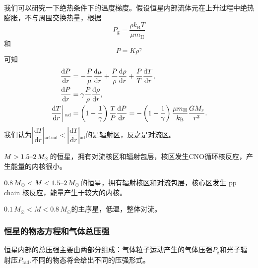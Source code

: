 \documentclass[../天体物理基础.tex]{subfiles}
\begin{document}
我们可以研究一下绝热条件下的温度梯度。假设恒星内部流体元在上升过程中绝热膨胀，不与周围交换热量，根据
\begin{equation}
P_{\text{g}}=\frac{\rho k_{\text{B}}T}{\mu m_{\mathrm{H}}}
\end{equation}
和
\begin{equation}
P=K\rho^{\gamma}
\end{equation}
可知
\begin{align}
\frac{\mathrm{d}P}{\mathrm{d}r}&=-\frac{P}{\mu}\frac{\mathrm{d}\mu}{\mathrm{d}r}+\frac{P}{\rho}\frac{\mathrm{d}\rho}{\mathrm{d}r}+\frac{P}{T}\frac{\mathrm{d}T}{\mathrm{d}r},\notag\\
\frac{\mathrm{d}P}{\mathrm{d}r}&=\gamma\frac{P}{\rho}\frac{\mathrm{d}\rho}{\mathrm{d}r},\notag\\
\left.\frac{\mathrm{d}T}{\mathrm{d}r}\right\vert{}_{\text{ad}}&=\left(1-\frac{1}{\gamma}\right)\frac{T}{P}\frac{\mathrm{d}P}{\mathrm{d}r}=-\left(1-\frac{1}{\gamma}\right)\frac{\mu m_{\mathrm{H}}}{k_{\text{B}}}\frac{GM_{r}}{r^{2}}.
\end{align}
我们认为$\left\vert{}\dfrac{\mathrm{d}T}{\mathrm{d}r}\right\vert{}_{\text{actual}}<\left\vert{}\dfrac{\mathrm{d}T}{\mathrm{d}r}\right\vert{}_{\text{ad}}$的是辐射区，反之是对流区。

$M>1.5\text{\textendash}2\,M_{\odot}$的恒星，拥有对流核区和辐射包层，核区发生$\mathrm{CNO}$循环核反应，产生能量的内核很小。

$0.8\,M_{\odot}<M<1.5\text{\textendash}2\,M_{\odot}$的恒星，拥有辐射核区和对流包层，核心区发生 pp chain 核反应，能量产生于较大的内核。

$0.1\,M_{\odot}<M<0.8\,M_{\odot}$的主序星，低温，整体对流。

\subsubsection{恒星的物态方程和气体总压强}
恒星内部的总压强主要由两部分组成：气体粒子运动产生的气体压强$P_{\text{g}}$和光子辐射压$P_{\text{rad}}$.不同的物态将会给出不同的压强形式。
\end{document}

